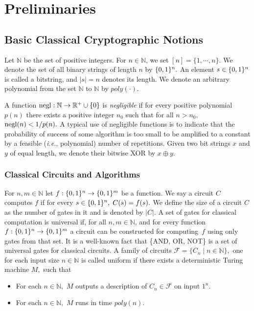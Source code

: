 \section{Preliminaries}
\label{sec:prelims}
\subsection{Basic Classical Cryptographic Notions}
\label{sec:classical-prelims}
Let $\mathbb{N}$ be the set of positive integers. For $n \in \mathbb{N}$, we set $[n] = \{1, \cdots, n\}.$ We denote the set of all  binary strings of length $n$ by $\{0,1\}^{n}.$
 An element $s \in \{0,1\}^{n}$ is called a bitstring, and $|s|=n$ denotes its length. We denote an arbitrary polynomial from the set $\mathbb{N}$ to $\mathbb{N}$ by $poly(\cdot).$


A function ${\rm negl}:\mathbb{N}\rightarrow\mathbb{R}^{+}\cup \{0\}$ is \emph{negligible} if for every positive polynomial $p(n)$ there exists a positive integer $n_0$ such that  for all  $n>n_0,$ ${\rm negl}(n) < 1/ p(n).$   A typical use of negligible functions is to indicate that the probability of success of some algorithm is too small to be amplified to a constant by a feasible (\emph{i.e.}, polynomial) number of repetitions. Given two bit strings $x$ and $y$ of equal length, we denote their bitwise XOR by $x \oplus y.$

\subsubsection{Classical Circuits and Algorithms}
 For $n, m\in\mathbb{N}$ let  $f:\{0,1\}^{n}\rightarrow \{0,1\}^{m}$ be a function. We say a circuit $C$ computes $f$ if for every $s \in \{0,1\}^{n},\; C(s)=f(s).$  We define the size of a circuit $C$ as the number of gates in it and is denoted by $|C|.$ A set of gates for classical computation is universal if, for all $n, m\in\mathbb{N}$, and for every function $f:\{0,1\}^{n}\rightarrow \{0,1\}^{m}$ a circuit can be constructed for computing~$f$ using only gates from that set. It is a well-known fact that \{AND, OR, NOT\} is a set of universal gates for classical circuits. A family of circuits $\mathcal{F}=\{C_n\mid n\in\mathbb{N}\},$ one for each input  size $n\in \mathbb{N}$ is called uniform if there exists a deterministic Turing machine $M,$ such that
 \begin{itemize}
 \item For each $n\in\mathbb{N},$ $M$ outputs a description of $C_n \in \mathcal{F}$ on input $1^n.$
 \item  For each $n\in\mathbb{N},$ $M$ runs in time $poly(n).$
 \end{itemize}

